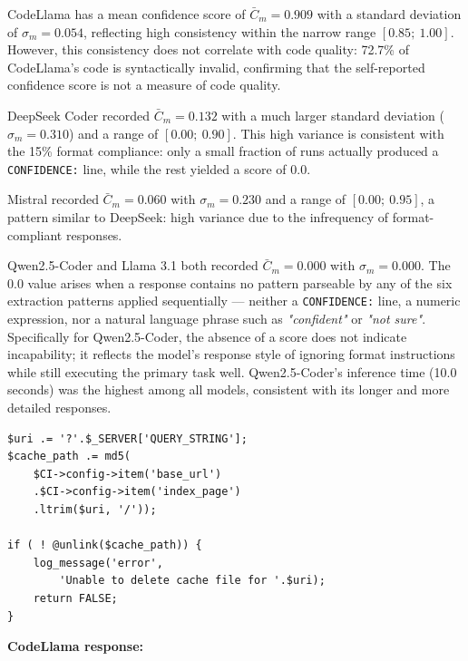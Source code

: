 CodeLlama has a mean confidence score of $\bar{C}_m = 0.909$ with a standard deviation of $\sigma_m = 0.054$, reflecting high consistency within the narrow range $[0.85;\ 1.00]$. However, this consistency does not correlate with code quality: 72.7\% of CodeLlama's code is syntactically invalid, confirming that the self-reported confidence score is not a measure of code quality.

DeepSeek Coder recorded $\bar{C}_m = 0.132$ with a much larger standard deviation ($\sigma_m = 0.310$) and a range of $[0.00;\ 0.90]$. This high variance is consistent with the 15\% format compliance: only a small fraction of runs actually produced a \texttt{CONFIDENCE:} line, while the rest yielded a score of 0.0.

Mistral recorded $\bar{C}_m = 0.060$ with $\sigma_m = 0.230$ and a range of $[0.00;\ 0.95]$, a pattern similar to DeepSeek: high variance due to the infrequency of format-compliant responses.

Qwen2.5-Coder and Llama 3.1 both recorded $\bar{C}_m = 0.000$ with $\sigma_m = 0.000$. The 0.0 value arises when a response contains no pattern parseable by any of the six extraction patterns applied sequentially — neither a \texttt{CONFIDENCE:} line, a numeric expression, nor a natural language phrase such as \textit{"confident"} or \textit{"not sure"}. Specifically for Qwen2.5-Coder, the absence of a score does not indicate incapability; it reflects the model's response style of ignoring format instructions while still executing the primary task well. Qwen2.5-Coder's inference time (10.0 seconds) was the highest among all models, consistent with its longer and more detailed responses.

\newpage
\begin{lstlisting}[style=promptstyle]
$uri .= '?'.$_SERVER['QUERY_STRING'];
$cache_path .= md5(
    $CI->config->item('base_url')
    .$CI->config->item('index_page')
    .ltrim($uri, '/'));

if ( ! @unlink($cache_path)) {
    log_message('error',
        'Unable to delete cache file for '.$uri);
    return FALSE;
}
\end{lstlisting}

\textbf{CodeLlama response:}

